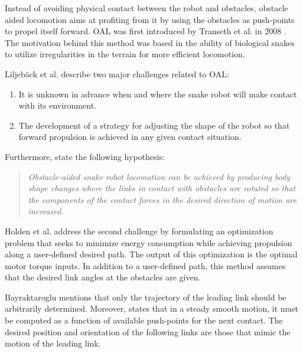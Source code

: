 Instead of avoiding physical contact between the robot and obstacles, obstacle aided locomotion aims at profiting from it by using the obstacles as push-points to propel itself forward. OAL was first introduced by Transeth et al. in 2008 \cite{transeth2008snake}. The motivation behind this method was based in the ability of biological snakes to utilize irregularities in the terrain for more efficient locomotion.

Liljebäck et al. \cite{liljeback2012snake} describe two major challenges related to OAL:
\begin{enumerate}
  \item It is unknown in advance when and where the snake robot will make contact with its environment.
  \item The development of a strategy for adjusting the shape of the robot so that forward propulsion is achieved in any given contact situation.
\end{enumerate}
Furthermore, \cite{liljeback2012snake} state the following hypothesis:
\begin{quote}
   \textit{ Obstacle-aided snake robot locomotion can be achieved by producing body shape changes where the links in contact with obstacles are rotated so that the components of the contact forces in the desired direction of motion are increased.}
\end{quote}

Holden et al. \cite{holden2014optimal} address the second challenge by formulating an optimization problem that seeks to minimize energy consumption while achieving propulsion along a user-defined desired path. The output of this optimization is the optimal motor torque inputs. In addition to a user-defined path, this method assumes that the desired link angles at the obstacles are given.

Bayraktaroglu \cite{bayraktaroglu2004understanding} mentions that only the trajectory of the leading link should be arbitrarily determined. Moreover, \cite{bayraktaroglu2004understanding} states that in a steady smooth motion, it must be computed as a function of available push-points for the next contact. The desired position and orientation of the following links are those that mimic the motion of the leading link.






